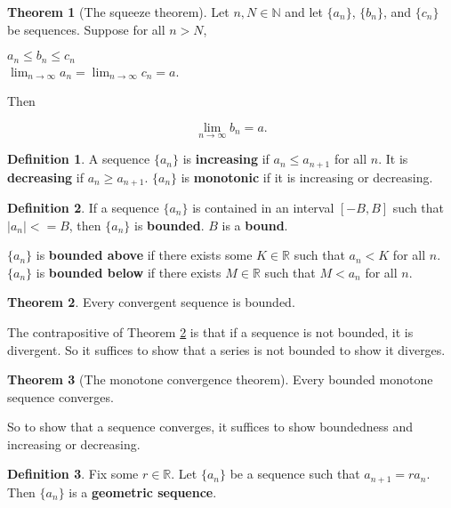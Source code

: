 \documentclass{article}
\theoremstyle{definition}
\newtheorem{definition}{Definition}[section]
\newtheorem{theorem}{Theorem}[section]
\begin{document}
\begin{theorem}[The squeeze theorem] Let $n, N \in \mathbb{N}$ and let $\{a_n\}$, $\{b_n\}$, and $\{c_n\}$ be sequences. Suppose for all $n > N$,

\begin{center}
$a_n \leq b_n \leq c_n $\\
$\lim_{n \to \infty} a_n = \lim_{n \to \infty} c_n = a$.
\end{center}

Then

\begin{equation}
\lim_{n \to \infty} b_n = a.
\end{equation}

\end{theorem}

\begin{definition}
A sequence $\{a_n\}$ is \textbf{increasing} if $a_n \leq a_{n+1}$ for all $n$. It is \textbf{decreasing} if $a_n \geq a_{n+1}$. $\{a_n\}$ is \textbf{monotonic} if it is increasing or decreasing.
\end{definition}

\begin{definition}
If a sequence $\{a_n\}$ is contained in an interval $[-B, B]$ such that $|a_n| <= B$, then $\{a_n\}$ is \textbf{bounded}. $B$ is a \textbf{bound}.

$\{a_n\}$ is \textbf{bounded above} if there exists some $K \in \mathbb{R}$ such that $a_n < K$ for all $n$. $\{a_n\}$ is \textbf{bounded below} if there exists $M \in \mathbb{R}$ such that $M < a_n$ for all $n$.
\end{definition}

\begin{theorem} \label{convergent-bounded}
Every convergent sequence is bounded.
\end{theorem}

The contrapositive of Theorem \ref{convergent-bounded} is that if a sequence is not bounded, it is divergent. So it suffices to show that a series is not bounded to show it diverges.

\begin{theorem}[The monotone convergence theorem]
Every bounded monotone sequence converges.
\end{theorem}

So to show that a sequence converges, it suffices to show boundedness and increasing or decreasing.

\begin{definition}
Fix some $r \in \mathbb{R}$. Let $\{a_n\}$ be a sequence such that $a_{n+1} = ra_n$. Then $\{a_n\}$ is a \textbf{geometric sequence}.
\end{definition}
\end{document}
